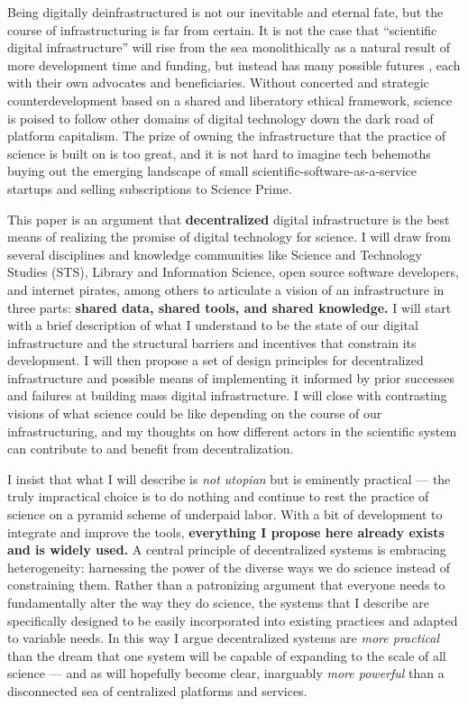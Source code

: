 \documentclass[11pt]{article}
\begin{document}
\begin{multicols}{2}
Being digitally deinfrastructured is not our inevitable and eternal
fate, but the course of infrastructuring is far from certain. It is not
the case that ``scientific digital infrastructure'' will rise from the
sea monolithically as a natural result of more development time and
funding, but instead has many possible futures\cite{mirowskiFutureOpenScience2018} , each with their own advocates and
beneficiaries. Without concerted and strategic counterdevelopment based
on a shared and liberatory ethical framework, science is poised to
follow other domains of digital technology down the dark road of
platform capitalism. The prize of owning the infrastructure that the
practice of science is built on is too great, and it is not hard to
imagine tech behemoths buying out the emerging landscape of small
scientific-software-as-a-service startups and selling subscriptions to
Science Prime.

This paper is an argument that \textbf{decentralized} digital
infrastructure is the best means of realizing the promise of digital
technology for science. I will draw from several disciplines and
knowledge communities like Science and Technology Studies (STS), Library
and Information Science, open source software developers, and internet
pirates, among others to articulate a vision of an infrastructure in
three parts: \textbf{shared data, shared tools, and shared knowledge.} I
will start with a brief description of what I understand to be the state
of our digital infrastructure and the structural barriers and incentives
that constrain its development. I will then propose a set of design
principles for decentralized infrastructure and possible means of
implementing it informed by prior successes and failures at building
mass digital infrastructure. I will close with contrasting visions of
what science could be like depending on the course of our
infrastructuring, and my thoughts on how different actors in the
scientific system can contribute to and benefit from decentralization.

I insist that what I will describe is \emph{not utopian} but is
eminently practical --- the truly impractical choice is to do nothing
and continue to rest the practice of science on a pyramid scheme \cite{ponziSciencePyramidScheme2020}  of underpaid labor. With a bit
of development to integrate and improve the tools, \textbf{everything I
propose here already exists and is widely used.} A central principle of
decentralized systems is embracing heterogeneity: harnessing the power
of the diverse ways we do science instead of constraining them. Rather
than a patronizing argument that everyone needs to fundamentally alter
the way they do science, the systems that I describe are specifically
designed to be easily incorporated into existing practices and adapted
to variable needs. In this way I argue decentralized systems are
\emph{more practical} than the dream that one system will be capable of
expanding to the scale of all science --- and as will hopefully become
clear, inarguably \emph{more powerful} than a disconnected sea of
centralized platforms and services.


\end{multicols}
\end{document}
